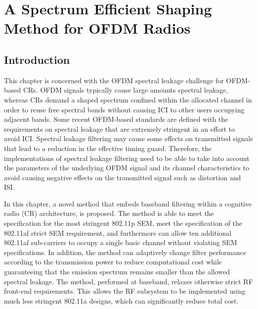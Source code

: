 \chapter{A Spectrum Efficient Shaping Method for OFDM Radios}
\label{chap:SpectralLeakage}

\section{Introduction}
\label{Sec:Intro}

This chapter is concerned with the OFDM spectral leakage challenge for OFDM-based CRs.
OFDM signals typically cause large amounts spectral leakage, whereas CRs demand a shaped spectrum confined within the allocated channel in order to reuse free spectral bands without causing ICI to other users occupying adjacent bands.
Some recent OFDM-based standards are defined with the requirements on spectral leakage that are extremely stringent in an effort  to avoid ICI.
Spectral leakage filtering may cause some effects on transmitted signals that lead to a reduction in the effective timing guard.
Therefore, the implementations of spectral leakage filtering need to be able to take into account the parameters of the underlying OFDM signal and its channel characteristics to avoid causing negative effects on the transmitted signal such as distortion and ISI.

In this chapter, a novel method that embeds baseband filtering within a cognitive radio (CR) architecture, is proposed.
The method is able to meet the specification for the most stringent 802.11p SEM, meet the specification of the 802.11af strict SEM requirement, and furthermore can allow ten additional 802.11af sub-carriers to occupy a single basic channel without violating SEM specifications.
In addition, the method can adaptively change filter performance according to the transmission power to reduce computational cost while guaranteeing that the emission spectrum remains smaller than the allowed spectral leakage.
The method, performed at baseband, relaxes otherwise strict RF front-end requirements.
This allows the RF subsystem to be implemented using much less stringent 802.11a designs, which can significantly reduce total cost.

